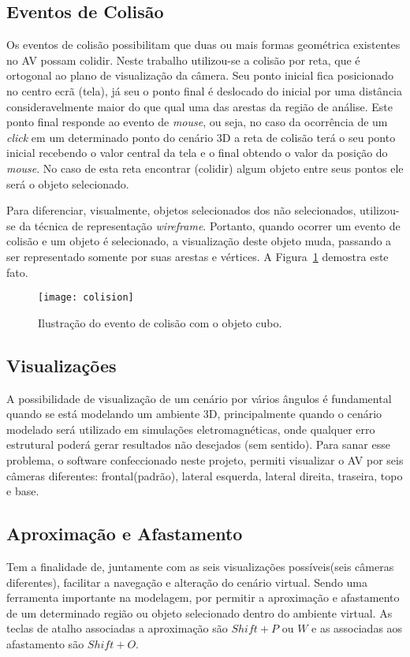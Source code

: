 \subsection{Eventos de Colisão}
\label{sec:colisao}
	Os eventos de colisão possibilitam que duas ou mais formas geométrica existentes no AV possam colidir.  Neste trabalho utilizou-se a colisão por reta, que é ortogonal ao plano de visualização da câmera. Seu ponto inicial fica posicionado no centro ecrã (tela), já seu o ponto final é deslocado do inicial por uma distância consideravelmente maior do que qual uma das arestas da região de análise. Este ponto final responde ao evento de \textit{mouse}, ou seja, no caso da ocorrência de um \textit{click}  em um determinado ponto do cenário 3D a reta de colisão terá o seu ponto inicial recebendo o valor central da tela e o final obtendo o valor da posição do \textit{mouse}.  No caso de esta reta encontrar (colidir) algum objeto entre seus pontos ele será o objeto selecionado. 
 
	Para diferenciar, visualmente, objetos selecionados dos não selecionados, utilizou-se da técnica de representação \textit{wireframe}. Portanto, quando ocorrer um evento de colisão e um objeto é selecionado, a visualização deste objeto muda, passando a ser representado somente por suas arestas e vértices. A Figura~\ref{fg:colision} demostra este fato.
\begin{figure}[!ht]
	\centering
	\texttt{[image: colision]}
	\caption{Ilustração do evento de colisão com o objeto cubo.}
	\label{fg:colision}
\end{figure}

\subsection{Visualizações}
	A possibilidade de visualização de um cenário por vários ângulos é fundamental quando se está modelando um ambiente 3D, principalmente quando o cenário modelado será utilizado em simulações eletromagnéticas, onde qualquer erro estrutural poderá gerar resultados não desejados (sem sentido). Para sanar esse problema, o software confeccionado neste projeto, permiti visualizar o AV por seis câmeras diferentes: frontal(padrão), lateral esquerda, lateral direita, traseira, topo e base. 

\subsection{Aproximação e Afastamento}
	Tem a finalidade de, juntamente com as seis visualizações possíveis(seis câmeras diferentes), facilitar a navegação e alteração do cenário virtual. Sendo uma ferramenta importante na modelagem, por permitir a aproximação e afastamento de um determinado região ou objeto selecionado dentro do ambiente virtual. As teclas de atalho associadas a aproximação são $Shift+P$ ou $W$ e as associadas aos afastamento são $Shift+O$.

